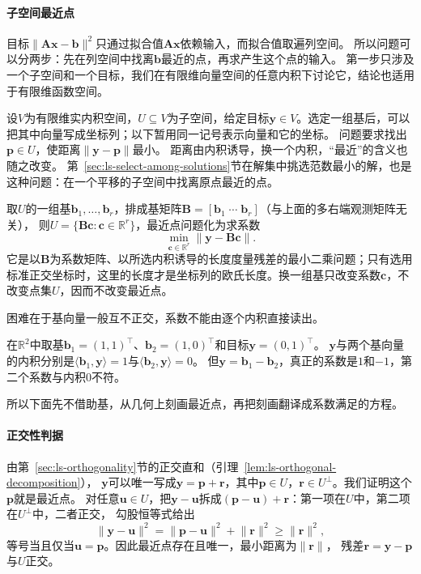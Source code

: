 \paragraph{子空间最近点}

目标$\lVert\bm A\bm x-\bm b\rVert^2$只通过拟合值$\bm A\bm x$依赖输入，而拟合值取遍列空间。
所以问题可以分两步：先在列空间中找离$\bm b$最近的点，再求产生这个点的输入。
第一步只涉及一个子空间和一个目标，我们在有限维向量空间的任意内积下讨论它，结论也适用于有限维函数空间。

设$V$为有限维实内积空间，$U\subseteq V$为子空间，给定目标$\bm y\in V$。选定一组基后，可以把其中向量写成坐标列；以下暂用同一记号表示向量和它的坐标。
问题要求找出$\bm p\in U$，使距离$\lVert\bm y-\bm p\rVert$最小。
距离由内积诱导，换一个内积，“最近”的含义也随之改变。
第~\ref{sec:ls-select-among-solutions}节在解集中挑选范数最小的解，也是这种问题：在一个平移的子空间中找离原点最近的点。

取$U$的一组基$\bm b_1,\ldots,\bm b_r$，排成基矩阵$\bm B=[\bm b_1\;\cdots\;\bm b_r]$（与上面的多右端观测矩阵无关），
则$U=\{\bm B\bm c:\bm c\in\mathbb R^r\}$，最近点问题化为求系数
\begin{equation}
 \min_{\bm c\in\mathbb R^r}\lVert\bm y-\bm B\bm c\rVert.
 \label{eq:ls-nearest-point-coefficients}
\end{equation}
它是以$\bm B$为系数矩阵、以所选内积诱导的长度度量残差的最小二乘问题；只有选用标准正交坐标时，这里的长度才是坐标列的欧氏长度。换一组基只改变系数$\bm c$，不改变点集$U$，因而不改变最近点。

困难在于基向量一般互不正交，系数不能由逐个内积直接读出。

\begin{example}[反例：非正交基下系数不等于内积]
\label{ex:ls-nonorthogonal-coefficients}
在$\mathbb R^2$中取基$\bm b_1=(1,1)^\top$、$\bm b_2=(1,0)^\top$和目标$\bm y=(0,1)^\top$。
$\bm y$与两个基向量的内积分别是$\langle\bm b_1,\bm y\rangle=1$与$\langle\bm b_2,\bm y\rangle=0$。
但$\bm y=\bm b_1-\bm b_2$，真正的系数是$1$和$-1$，第二个系数与内积$0$不符。
\end{example}

所以下面先不借助基，从几何上刻画最近点，再把刻画翻译成系数满足的方程。

\paragraph{正交性判据}

由第~\ref{sec:ls-orthogonality}节的正交直和（引理~\ref{lem:ls-orthogonal-decomposition}），
$\bm y$可以唯一写成$\bm y=\bm p+\bm r$，其中$\bm p\in U$，$\bm r\in U^\perp$。我们证明这个$\bm p$就是最近点。
对任意$\bm u\in U$，把$\bm y-\bm u$拆成$(\bm p-\bm u)+\bm r$：第一项在$U$中，第二项在$U^\perp$中，二者正交，
勾股恒等式给出
\begin{equation}
 \lVert\bm y-\bm u\rVert^2
 =\lVert\bm p-\bm u\rVert^2+\lVert\bm r\rVert^2
 \geq\lVert\bm r\rVert^2,
 \label{eq:ls-nearest-point-pythagoras}
\end{equation}
等号当且仅当$\bm u=\bm p$。因此最近点存在且唯一，最小距离为$\lVert\bm r\rVert$，
残差$\bm r=\bm y-\bm p$与$U$正交。

